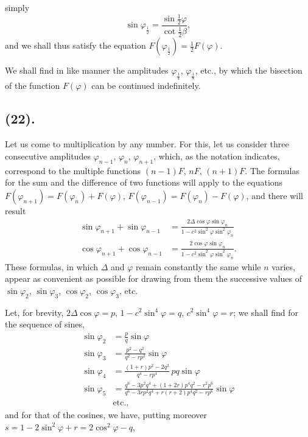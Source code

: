 \documentclass{article}
\begin{document}
simply
\[ \sin\varphi_{\frac{1}{2}}=\frac{\sin\frac{1}{2}\varphi}{\cot\frac{1}{2}\beta}, \]
 and we shall thus satisfy the equation $F(\varphi_{\frac{1}{2}})=\frac{1}{2}F(\varphi)$.

We shall find in like manner the amplitudes $\varphi_{\frac{1}{4}}$, $\varphi_{\frac{1}{8}}$, etc., by which the bisection of the function $F(\varphi)$ can be continued indefinitely.

\subsection*{(22).}

Let us come to multiplication by any number. For this, let us consider three consecutive amplitudes $\varphi_{n-1}$, $\varphi_{n}$, $\varphi_{n+1}$, which, as the notation indicates, correspond to the multiple functions $(n-1)F$, $nF$, $(n+1)F$. The formulas for the sum and the difference of two functions will apply to the equations $F(\varphi_{n+1})=F(\varphi_{n})+F(\varphi)$, $F(\varphi_{n-1})=F(\varphi_{n})-F(\varphi)$, and there will result
\[ \begin{aligned} \sin\varphi_{n+1}+\sin\varphi_{n-1} &= \frac{2\Delta\cos\varphi\sin\varphi_{n}}{1-c^{2}\sin^{2}\varphi\sin^{2}\varphi_{n}} \\ \cos\varphi_{n+1}+\cos\varphi_{n-1} &= \frac{2\cos\varphi\sin\varphi_{n}}{1-c^{2}\sin^{2}\varphi\sin^{2}\varphi_{n}}. \end{aligned} \]
 These formulas, in which $\Delta$ and $\varphi$ remain constantly the same while $n$ varies, appear as convenient as possible for drawing from them the successive values of $\sin\varphi_{2}$, $\sin\varphi_{3}$, $\cos\varphi_{2}$, $\cos\varphi_{3}$, etc.

Let, for brevity, $2\Delta\cos\varphi=p$, $1-c^{2}\sin^{4}\varphi=q$, $c^{2}\sin^{4}\varphi=r$; we shall find for the sequence of sines,
\[ \begin{aligned} \sin\varphi_{2} &= \frac{p}{q}\sin\varphi \\ \sin\varphi_{3} &= \frac{p^{2}-q^{2}}{q^{2}-rp^{2}}\sin\varphi \\ \sin\varphi_{4} &= \frac{(1+r)p^{2}-2q^{2}}{q^{4}-rp^{4}}\,pq\sin\varphi \\ \sin\varphi_{5} &= \frac{q^{6}-3p^{2}q^{4}+(1+2r)p^{4}q^{2}-r^{2}p^{6}}{q^{6}-3rp^{2}q^{4}+r(r+2)p^{4}q^{2}-rp^{6}}\sin\varphi \\ &\text{etc.}, \end{aligned} \]
and for that of the cosines, we have, putting moreover $s=1-2\sin^{2}\varphi+r=2\cos^{2}\varphi-q$,
\end{document}

